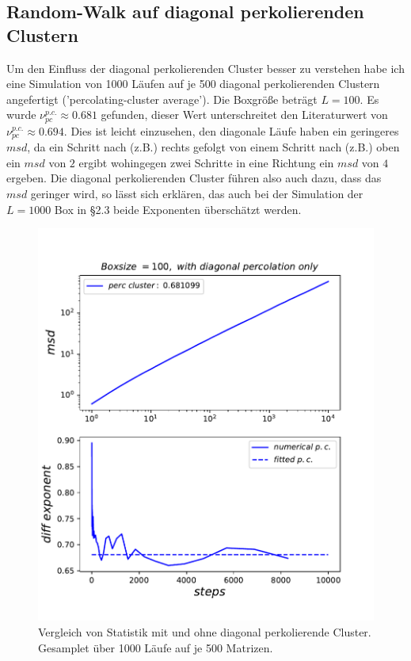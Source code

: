 \documentclass[a4paper, 12pt]{scrartcl}
\begin{document}
\subsection{Random-Walk auf diagonal perkolierenden Clustern}
Um den Einfluss der diagonal perkolierenden Cluster besser zu verstehen habe ich eine Simulation von 1000 Läufen auf je 500 diagonal perkolierenden Clustern angefertigt ('percolating-cluster average'). Die Boxgröße beträgt $L=100$. Es wurde $\nu_{pc}^{p.c.} \approx 0.681$ gefunden, dieser Wert unterschreitet den Literaturwert von $\nu_{pc}^{p.c.} \approx 0.694$. Dies ist leicht einzusehen, den diagonale Läufe haben ein geringeres $msd$, da ein Schritt nach (z.B.) rechts gefolgt von einem Schritt nach (z.B.) oben ein $msd$ von $2$ ergibt wohingegen zwei Schritte in eine Richtung ein $msd$ von $4$ ergeben. Die diagonal perkolierenden Cluster führen also auch dazu, dass das $msd$ geringer wird, so lässt sich erklären, das auch bei der Simulation der $L=1000$ Box in §2.3 beide Exponenten überschätzt werden.

\begin{figure}[h!]
	\centering
	\includegraphics[scale=0.9]{diagpc100.pdf}
	\caption{Vergleich von Statistik mit und ohne diagonal perkolierende Cluster. Gesamplet über 1000 Läufe auf je 500 Matrizen.}
\end{figure}
\end{document}
